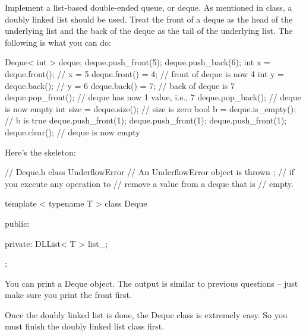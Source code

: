 Implement a list-based double-ended queue, or deque.
As mentioned in class, a doubly linked list should be used.
Treat the front of a deque as the head of the underlying list
and the back of the deque as the tail of the underlying list.
The following is what you can do:
\begin{console}[fontsize=\footnotesize]
Deque< int > deque;
deque.push_front(5);      
deque.push_back(6);
int x = deque.front();     // x = 5
deque.front() = 4;         // front of deque is now 4
int y = deque.back();      // y = 6
deque.back() = 7;          // back of deque is 7
deque.pop_front();         // deque has now 1 value, i.e., 7
deque.pop_back();          // deque is now empty
int size = deque.size();   // size is zero
bool b = deque.is_empty(); // b is true
deque.push_front(1);
deque.push_front(1);
deque.push_front(1);
deque.clear();             // deque is now empty
\end{console} 
Here's the skeleton:
\begin{console}[fontsize=\footnotesize]
// Deque.h
class UnderflowError       // An UnderflowError object is thrown
{};                        // if you execute any operation to
                           // remove a value from a deque that is
                           // empty.
                           
template < typename T >
class Deque
{
public:

private:
    DLList< T > list_;
};
\end{console}
You can print a Deque object.
The output is similar to previous questions -- just 
make sure you print the front first.

Once the doubly linked list is done, the Deque class is extremely easy.
So you must finish the doubly linked list class first.
